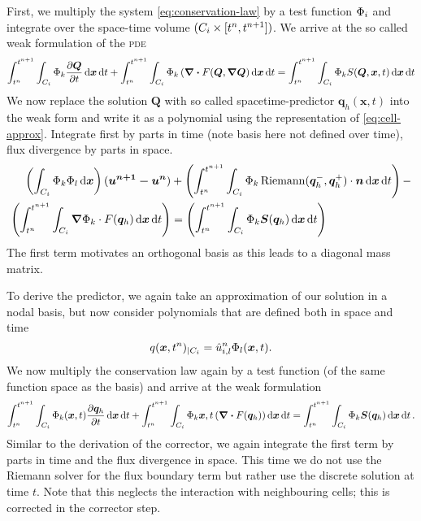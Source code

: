 \newcommand{\dsol}{\bm{u}}
\newcommand{\stpredictor}[1][h]{\bm{q}_{#1}}
First, we multiply the system \cref{eq:conservation-law} by a test function $\Phi_{i}$ and integrate over the space-time volume $(C_{i} \times [t^n, t^{n+1}])$.
We arrive at the so called weak formulation of the \textsc{pde} 
\begin{equation}
  \label{eq:weak-pde}
\intdt{\intdcell{
\testfunction{k} \pdv{\Q}{t}
}}
+
\intdt{\intdcell{
    \testfunction{k} \left( \div{F(\Q, \gradQ} \right)
}}
=
\intdt{\intdcell{
    \testfunction{k} S(\Q, \bm{x}, t)
}}
\end{equation}
We now replace the solution $\bm{Q}$ with so called spacetime-predictor $\stpredictor (\bm{x},t)$ into the weak form and write it as a polynomial using the representation of \cref{eq:cell-approx}.
Integrate first by parts in time (note basis here not defined over time), flux divergence by parts in space.
\begin{align}
\begin{split}
\label{eq:corrector}
\left(
\intdcell{
  \testfunction{k} \sbasis{l}
}
\right)
(\bm{u^{n+1} - u^{n}})
&+
\left(\intdt{\intdcell{
      \testfunction{k} \Riemann(\stpredictor^-, \stpredictor^+) \cdot \normal
}}\right)
-\\
\left(\intdt{\intdcell{
    \gradient{\testfunction{k}} \cdot  \flux(\stpredictor)
}}\right)
&=
\left(\intdt{\intdcell{
      \testfunction{k} \source(\stpredictor)
}}\right)
\end{split}
\end{align}
The first term motivates an orthogonal basis as this leads to a diagonal mass matrix.

To derive the predictor, we again take an approximation of our solution in a nodal basis, but now consider polynomials that are defined both in space and time
\begin{equation}
  \label{eq:cell-approx-time}
  q(\bm{x}, t^n)_{|\cell[i]} = \hat{u}^n_{i,l} \stbasis{l}(\bm{x}, t).
\end{equation}
We now multiply the conservation law again by a test function (of the same function space as the basis) and arrive at the weak formulation
\begin{equation}\label{eq:weak-pde-space-time}
\intdt{\intdcell{
    \testfunction{k}(\bm{x}, t)
    \pdv{\stpredictor}{t}
}}
+
\intdt{\intdcell{
    \testfunction{k}{\bm{x}, t}
    \left(
      \divergence{\flux(\stpredictor)}
    \right)
}}
=
\intdt{\intdcell{
  \testfunction{k} \source(\stpredictor)
}}.
\end{equation}
Similar to the derivation of the corrector, we again integrate the first term by parts in time and the flux divergence in space.
This time we do not use the Riemann solver for the flux boundary term but rather use the discrete solution at time $t$.
Note that this neglects the interaction with neighbouring cells; this is corrected in the corrector step.

